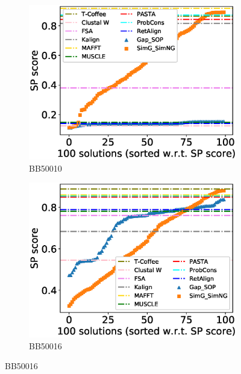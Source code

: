 \begin{figure}[!htbp]
\begin{adjustwidth}{-1.5cm}{-1cm}
		\begin{subfigure}{0.22\textwidth}
			\includegraphics[width=\columnwidth]{Figure/summary/precomputedInit/Balibase/BB50010_pairs_density_single_run_2}
			\caption{BB50010}
		\end{subfigure}
		\begin{subfigure}{0.22\textwidth}
			\includegraphics[width=\columnwidth]{Figure/summary/precomputedInit/Balibase/BB50016_pairs_density_single_run_2}
			\caption{BB50016}
		\end{subfigure}
		

\end{adjustwidth}
\end{figure}

